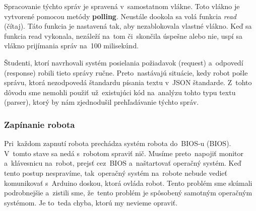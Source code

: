 	Spracovanie týchto správ je spravená v~samostatnom vlákne. Toto vlákno je vytvorené pomocou metódy \textbf{polling}.
	Neustále dookola sa volá funkcia \textit{read} (čítaj). Táto funkcia je nastavená tak, aby nezablokovala vlastné vlákno.
	Keď sa funkcia read vykonala, nezáleží na~tom či~skončila úspešne alebo nie, uspí sa vlákno prijímania správ na~100 milisekúnd.

	Študenti, ktorí navrhovali systém posielania požiadavok (request) a~odpovedí (response) robili tieto správy
	ručne. Preto~nastávajú situácie, kedy robot pošle správu, ktorá nezodpovedá štandardu písania textu v~JSON
	štandarde. Z~tohto dôvodu sme nemohli použiť už~existujúci kód na~analýzu tohto typu textu (parser), ktorý
	by nám zjednodušil prehľadávanie týchto správ.

\subsubsection{Zapínanie robota}
\label{subsec:zapinanieRobota}

	Pri~každom zapnutí robota prechádza systém robota do~BIOS-u (\acrlong{BIOS}). V~tomto stave sa nedá s~robotom spraviť
	nič. Musíme preto~napojiť monitor a~klávesnicu na~robot, prejsť cez~BIOS a~naštartovať operačný systém. Keď tento
	postup nespravíme, tak~operačný systém na~robote nebude vedieť komunikovať s~Arduino doskou, ktorá ovláda robot.
	Tento problém sme skúmali podrobnejšie a~zistili sme, že~tento problém je spôsobený samotným operačným systémom.
	Je to~teda chyba, ktorú my nevieme opraviť.

